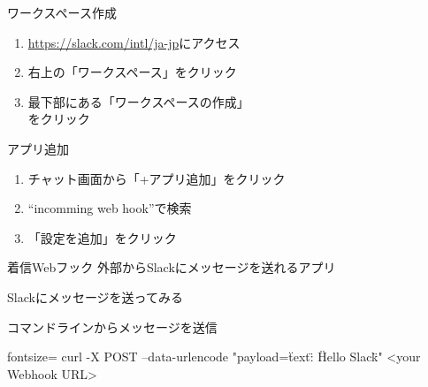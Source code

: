 \documentclass[dvipdfmx,xcolor={svgnames}]{beamer}
\begin{document}
  \begin{frame}{ワークスペース作成}
    \begin{enumerate}\Large\setlength{\itemsep}{15pt}
      \item \url{https://slack.com/intl/ja-jp}にアクセス
      \item 右上の「ワークスペース」をクリック
      \item 最下部にある「ワークスペースの作成」 \\ をクリック
    \end{enumerate}
  \end{frame}
  \begin{frame}{アプリ追加}
    \begin{enumerate}\Large\setlength{\itemsep}{15pt}
      \item チャット画面から「+アプリ追加」をクリック
      \item ``incomming web hook''で検索
      \item 「設定を追加」をクリック
    \end{enumerate}
    \begin{block}{着信Webフック}
      外部からSlackにメッセージを送れるアプリ
    \end{block}
  \end{frame}
  \begin{frame}[fragile]{Slackにメッセージを送ってみる}
    \begin{exampleblock}{コマンドラインからメッセージを送信}
      \begin{GAS*}{fontsize=\Large}
curl -X POST --data-urlencode
"payload={\"text\": \"Hello Slack\"}"
<your Webhook URL>
\end{GAS*}
    \end{exampleblock}
  \end{frame}
\end{document}

